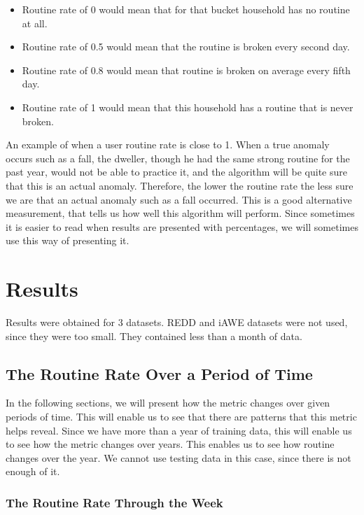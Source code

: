 \begin{itemize}
	\item Routine rate of 0 would mean that for that bucket household has no routine at all.
    \item Routine rate of 0.5 would mean that the routine is broken every second day.
    \item Routine rate of 0.8 would mean that routine is broken on average every fifth day.
    \item Routine rate of 1 would mean that this household has a routine that is never broken. 
\end{itemize}

An example of when a user routine rate is close to 1. When a true anomaly occurs such as a fall, the dweller, though he had the same strong routine for the past year, would not be able to practice it, and the algorithm will be quite sure that this is an actual anomaly.
Therefore, the lower the routine rate the less sure we are that an actual anomaly such as a fall occurred.
This is a good alternative measurement, that tells us how well this algorithm will perform. 
Since sometimes it is easier to read when results are presented with percentages, we will sometimes use this way of presenting it.
 
\section{Results} 

Results were obtained for 3 datasets. 
REDD and iAWE datasets were not used, since they were too small. 
They contained less than a month of data. 

\subsection{The Routine Rate Over a Period of Time}

In the following sections, we will present how the metric changes over given periods of time.
This will enable us to see that there are patterns that this metric helps reveal. 
Since we have more than a year of training data, this will enable us to see how the metric changes over years.
This enables us to see how routine changes over the year. 
We cannot use testing data in this case, since there is not enough of it.

\subsubsection{The Routine Rate Through the Week} \label{sssec:ratio_week}

